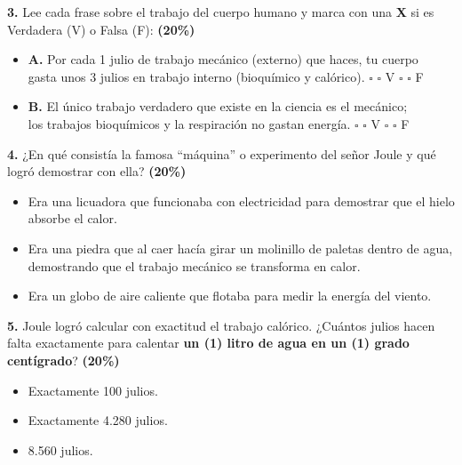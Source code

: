 \documentclass[12pt, letterpaper]{article}
\newif\ifshowanswers
\newcommand{\choice}[1]{%
	\ifshowanswers
	\if#1V \textcolor{blue}{$\boxtimes$}\else $\square$\fi
	\else
	$\square$
	\fi
}
\begin{document}
	\vspace{0.5cm}
	\noindent \textbf{3.} Lee cada frase sobre el trabajo del cuerpo humano y marca con una \textbf{X} si es Verdadera (V) o Falsa (F): \hfill\textbf{(20\%)}
	
	\vspace{0.3cm} 
	\begin{itemize}[itemsep=0.6cm, label={}] 
		\item \textbf{A.} Por cada 1 julio de trabajo mecánico (externo) que haces, tu cuerpo\\
		 gasta unos 3 julios en trabajo interno (bioquímico y calórico). \hfill  \choice{V} V \quad  \choice{F} F 
		\item \textbf{B.} El único trabajo verdadero que existe en la ciencia es el mecánico;\\
		los trabajos bioquímicos y la respiración no gastan energía. \hfill  \choice{F} V \quad  \choice{V} F 
	\end{itemize}
	
	\newpage
	\noindent \textbf{4.} ¿En qué consistía la famosa ``máquina'' o experimento del señor Joule y qué logró demostrar con ella? \hfill\textbf{(20\%)}
	
	\vspace{0.3cm} 
	\begin{itemize}[itemsep=0.5cm, label={}] 
		\item[ \choice{F} ] Era una licuadora que funcionaba con electricidad para demostrar que el hielo absorbe el calor. 
		\item[ \choice{V} ] Era una piedra que al caer hacía girar un molinillo de paletas dentro de agua, demostrando que el trabajo mecánico se transforma en calor. 
		\item[ \choice{F} ] Era un globo de aire caliente que flotaba para medir la energía del viento. 
	\end{itemize}
	
	\vspace{0.5cm}
	\noindent \textbf{5.} Joule logró calcular con exactitud el trabajo calórico. ¿Cuántos julios hacen falta exactamente para calentar \textbf{un (1) litro de agua en un (1) grado centígrado}? \hfill\textbf{(20\%)}
	
	\vspace{0.4cm} 
	\begin{itemize}[itemsep=0.5cm, label={}] 
		\item[ \choice{F} ] Exactamente 100 julios. 
		\item[ \choice{V} ] Exactamente 4.280 julios. 
		\item[ \choice{F} ] 8.560 julios. 
	\end{itemize}
	
\end{document}
